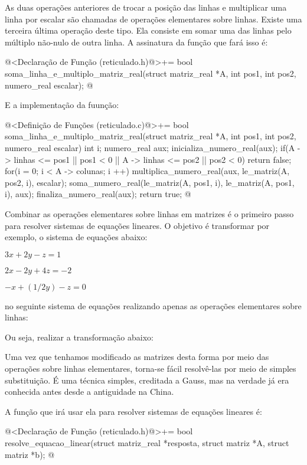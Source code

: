 As duas operações anteriores de trocar a posição das linhas e
multiplicar uma linha por escalar são chamadas de operações
elementares sobre linhas. Existe uma terceira última operação deste
tipo. Ela consiste em somar uma das linhas pelo múltiplo não-nulo de
outra linha. A assinatura da função que fará isso é:

\iniciocodigo
@<Declaração de Função (reticulado.h)@>+=
bool soma_linha_e_multiplo_matriz_real(struct matriz_real *A, int pos1,
                                      int pos2, numero_real escalar);
@
\fimcodigo

E a implementação da fuunção:

@<Definição de Funções (reticulado.c)@>+=
bool soma_linha_e_multiplo_matriz_real(struct matriz_real *A, int pos1,
                                      int pos2, numero_real escalar){
  int i;
  numero_real aux;
  inicializa_numero_real(aux);
  if(A -> linhas <= pos1 || pos1 < 0 || A -> linhas <= pos2 || pos2 < 0)
    return false;
  for(i = 0; i < A -> colunas; i ++){
    multiplica_numero_real(aux, le_matriz(A, pos2, i), escalar);
    soma_numero_real(le_matriz(A, pos1, i), le_matriz(A, pos1, i),
                     aux);
  }
  finaliza_numero_real(aux);
  return true;
}
@
\fimcodigo

Combinar as operações elementares sobre linhas em matrizes é o
primeiro passo para resolver sistemas de equações lineares. O objetivo
é transformar por exemplo, o sistema de equações abaixo:


$3x+2y-z=1$

$2x-2y+4z=-2$

$-x+(1/2y)-z=0$

no seguinte sistema de equações realizando apenas as operações
elementares sobre linhas:


Ou seja, realizar a transformação abaixo:


Uma vez que tenhamos modificado as matrizes desta forma por meio das
operações sobre linhas elementares, torna-se fácil resolvê-las por
meio de simples substituição. É uma técnica simples, creditada a
Gauss, mas na verdade já era conhecida antes desde a antiguidade na
China.

A função que irá usar ela para resolver sistemas de equações lineares
é:

\iniciocodigo
@<Declaração de Função (reticulado.h)@>+=
bool resolve_equacao_linear(struct matriz_real *resposta,
                           struct matriz *A, struct matriz *b);
@
\fimcodigo

